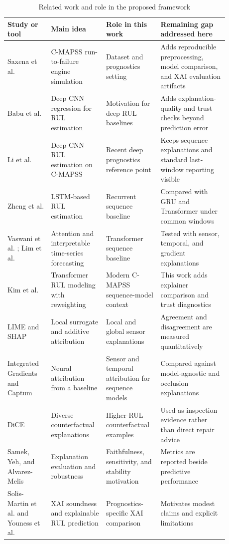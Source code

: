 \documentclass[conference]{IEEEtran}
\begin{document}
\begin{table}[!t]
\caption{Related work and role in the proposed framework}
\label{tab:related}
\centering
\scriptsize
\begin{tabular}{p{0.18\linewidth}p{0.22\linewidth}p{0.20\linewidth}p{0.28\linewidth}}
\toprule
Study or tool & Main idea & Role in this work & Remaining gap addressed here \\
\midrule
Saxena et al. \cite{saxena2008damage} & C-MAPSS run-to-failure engine simulation & Dataset and prognostics setting & Adds reproducible preprocessing, model comparison, and XAI evaluation artifacts \\
\addlinespace
Babu et al. \cite{babu2016deep} & Deep CNN regression for RUL estimation & Motivation for deep RUL baselines & Adds explanation-quality and trust checks beyond prediction error \\
\addlinespace
Li et al. \cite{li2018deepcnn} & Deep CNN RUL estimation on C-MAPSS & Recent deep prognostics reference point & Keeps sequence explanations and standard last-window reporting visible \\
\addlinespace
Zheng et al. \cite{zheng2017lstm} & LSTM-based RUL estimation & Recurrent sequence baseline & Compared with GRU and Transformer under common windows \\
\addlinespace
Vaswani et al. \cite{vaswani2017attention}; Lim et al. \cite{lim2021temporal} & Attention and interpretable time-series forecasting & Transformer sequence baseline & Tested with sensor, temporal, and gradient explanations \\
\addlinespace
Kim et al. \cite{kim2024transformer} & Transformer RUL modeling with reweighting & Modern C-MAPSS sequence-model context & This work adds explainer comparison and trust diagnostics \\
\addlinespace
LIME and SHAP \cite{ribeiro2016lime,lundberg2017shap} & Local surrogate and additive attribution & Local and global sensor explanations & Agreement and disagreement are measured quantitatively \\
\addlinespace
Integrated Gradients and Captum \cite{sundararajan2017integrated,kokhlikyan2020captum} & Neural attribution from a baseline & Sensor and temporal attribution for sequence models & Compared against model-agnostic and occlusion explanations \\
\addlinespace
DiCE \cite{mothilal2020dice} & Diverse counterfactual explanations & Higher-RUL counterfactual examples & Used as inspection evidence rather than direct repair advice \\
\addlinespace
Samek, Yeh, and Alvarez-Melis \cite{samek2017evaluating,yeh2019infidelity,alvarez2018robustness} & Explanation evaluation and robustness & Faithfulness, sensitivity, and stability motivation & Metrics are reported beside predictive performance \\
\addlinespace
Solis-Martin et al. and Youness et al. \cite{solismartin2023soundness,youness2023xai} & XAI soundness and explainable RUL prediction & Prognostics-specific XAI comparison & Motivates modest claims and explicit limitations \\
\bottomrule
\end{tabular}
\end{table}
\end{document}
